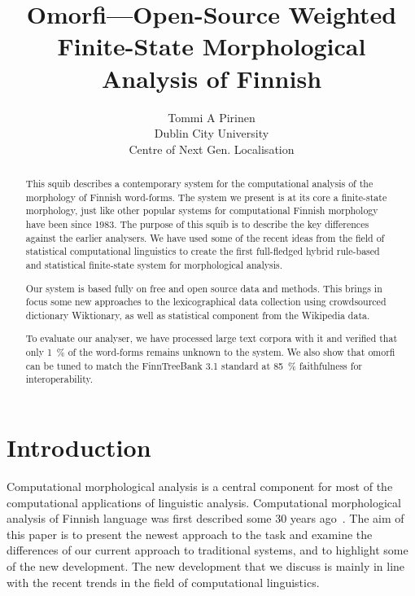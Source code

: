 \documentclass[a4paper,12pt]{article}
\title{Omorfi---Open-Source Weighted Finite-State Morphological Analysis of
Finnish}
\author{Tommi A Pirinen \\
    Dublin City University\\
    Centre of Next Gen. Localisation}
\date{}
\begin{document}
\maketitle
\begin{abstract}

    This squib describes a contemporary system for the computational analysis of
    the morphology of Finnish word-forms. The system we present is at its core a
    finite-state morphology, just like other popular systems for computational
    Finnish morphology have been since 1983.  The purpose of this squib is to
    describe the key differences against the earlier analysers.  We have used
    some of the recent ideas from the field of statistical computational
    linguistics to create the first full-fledged hybrid rule-based and
    statistical finite-state system for morphological analysis.

    Our system is based fully on free and open source data and methods. This
    brings in focus some new approaches to the lexicographical data collection
    using crowd\-sour\-ced dictionary Wiktionary, as well as statistical
    component from the Wikipedia data.

    To evaluate our analyser, we have processed large text corpora with it
    and verified that only 1~\% of the word-forms remains unknown to the
    system. We also show that omorfi can be tuned to match the FinnTreeBank 3.1
    standard at 85~\% faithfulness for interoperability.
\end{abstract}
\section{Introduction}

Computational morphological analysis is a central component for most of the
computational applications of linguistic analysis. Computational morphological
analysis of Finnish language was first described some 30 years
ago~\citep{koskenniemi1983twolevel}. The aim of this paper is to present the
newest approach to the task and examine the differences of our current approach
to traditional systems, and to highlight some of the new development. The
new development that we discuss is mainly in line with the recent trends in
the field of computational linguistics.
\end{document}

